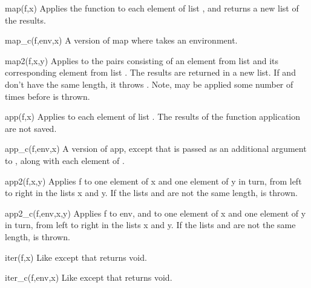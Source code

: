 \begin{defun}{map}{(f,x)}
Applies the function  to each element of list , and
returns a new list of the results.
\end{defun}

\begin{defun}{map_c}{(f,env,x)}
A version of map where  takes an environment.
\end{defun}

\begin{defun}{map2}{(f,x,y)}
Applies  to the pairs consisting of an element from list 
and its corresponding element from list .  The results are
returned in a new list.  If  and  don't have the same
length, it throws .  Note,  may be applied
some number of times before  is thrown.
\end{defun}

\begin{defun}{app}{(f,x)}
Applies  to each element of list .  The results of the
function application are not saved.
\end{defun}

\begin{defun}{app_c}{(f,env,x)}
A version of app, except that  is passed as an additional
argument to , along with each element of .
\end{defun}

\begin{defun}{app2}{(f,x,y)}
Applies f to one element of x and one element of y in turn, from left to
right in the lists x and y.  If the lists  and  are not
the same length,  is thrown.
\end{defun}

\begin{defun}{app2_c}{(f,env,x,y)}
Applies f to env, and to one element of x and one element of y in turn,
from left to right in the lists x and y.  If the lists  and
 are not the same length,  is thrown.
\end{defun}

\begin{defun}{iter}{(f,x)}
Like  except that  returns void.
\end{defun}

\begin{defun}{iter_c}{(f,env,x)}
Like  except that  returns
void.
\end{defun}


